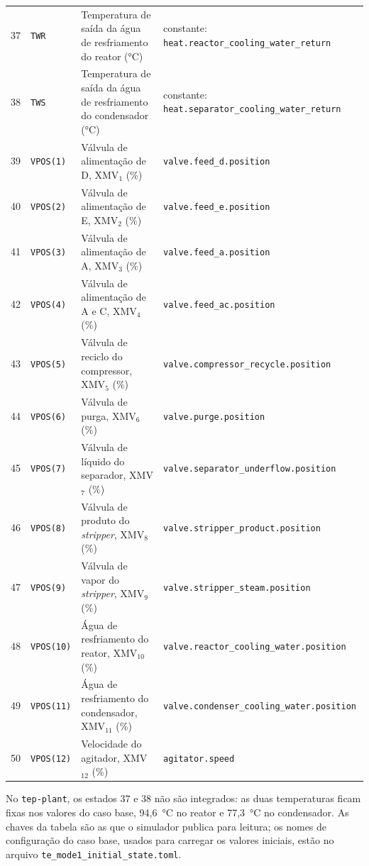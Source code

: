 \begin{longtable}{cl>{\raggedright\arraybackslash}p{4.3cm}>{\raggedright\arraybackslash}p{6.0cm}}
	37     & \texttt{TWR}        & Temperatura de saída da água de resfriamento do reator (°C) & constante: \texttt{heat.\allowbreak{}reactor\_cooling\_water\_return} \\
	38     & \texttt{TWS}        & Temperatura de saída da água de resfriamento do condensador (°C) & constante: \texttt{heat.\allowbreak{}separator\_cooling\_water\_return} \\
	39     & \texttt{VPOS(1)}    & Válvula de alimentação de D, XMV$_1$ (\%) & \texttt{valve.\allowbreak{}feed\_d.\allowbreak{}position} \\
	40     & \texttt{VPOS(2)}    & Válvula de alimentação de E, XMV$_2$ (\%) & \texttt{valve.\allowbreak{}feed\_e.\allowbreak{}position} \\
	41     & \texttt{VPOS(3)}    & Válvula de alimentação de A, XMV$_3$ (\%) & \texttt{valve.\allowbreak{}feed\_a.\allowbreak{}position} \\
	42     & \texttt{VPOS(4)}    & Válvula de alimentação de A e C, XMV$_4$ (\%) & \texttt{valve.\allowbreak{}feed\_ac.\allowbreak{}position} \\
	43     & \texttt{VPOS(5)}    & Válvula de reciclo do compressor, XMV$_5$ (\%) & \texttt{valve.\allowbreak{}compressor\_recycle.\allowbreak{}position} \\
	44     & \texttt{VPOS(6)}    & Válvula de purga, XMV$_6$ (\%) & \texttt{valve.\allowbreak{}purge.\allowbreak{}position} \\
	45     & \texttt{VPOS(7)}    & Válvula de líquido do separador, XMV$_7$ (\%) & \texttt{valve.\allowbreak{}separator\_underflow.\allowbreak{}position} \\
	46     & \texttt{VPOS(8)}    & Válvula de produto do \textit{stripper}, XMV$_8$ (\%) & \texttt{valve.\allowbreak{}stripper\_product.\allowbreak{}position} \\
	47     & \texttt{VPOS(9)}    & Válvula de vapor do \textit{stripper}, XMV$_9$ (\%) & \texttt{valve.\allowbreak{}stripper\_steam.\allowbreak{}position} \\
	48     & \texttt{VPOS(10)}   & Água de resfriamento do reator, XMV$_{10}$ (\%) & \texttt{valve.\allowbreak{}reactor\_cooling\_water.\allowbreak{}position} \\
	49     & \texttt{VPOS(11)}   & Água de resfriamento do condensador, XMV$_{11}$ (\%) & \texttt{valve.\allowbreak{}condenser\_cooling\_water.\allowbreak{}position} \\
	50     & \texttt{VPOS(12)}   & Velocidade do agitador, XMV$_{12}$ (\%) & \texttt{agitator.\allowbreak{}speed} \\
\end{longtable}
\endgroup
\vspace{-1.5em}

No \texttt{tep-plant}, os estados 37 e 38 não são integrados: as duas temperaturas ficam fixas nos valores do caso base, 94,6~°C no reator e 77,3~°C no condensador. As chaves da tabela são as que o simulador publica para leitura; os nomes de configuração do caso base, usados para carregar os valores iniciais, estão no arquivo \texttt{te\_mode1\_initial\_state.\allowbreak{}toml}.
